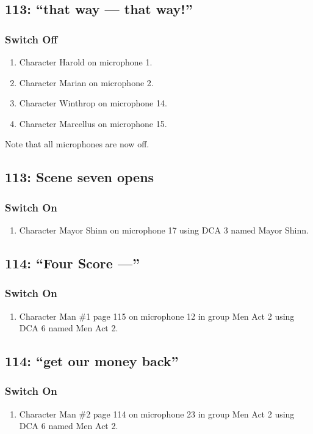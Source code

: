 \subsection* {113: ``that way --- that way!''}
\subsubsection* {Switch Off}
\begin{enumerate}
\item Character Harold on microphone 1.
\item Character Marian on microphone 2.
\item Character Winthrop on microphone 14.
\item Character Marcellus on microphone 15.
\end{enumerate}
Note that all microphones are now off.
\subsection* {113: Scene seven opens}
\subsubsection* {Switch On}
\begin{enumerate}
\item Character Mayor Shinn on microphone 17 using DCA 3 named Mayor Shinn.
\end{enumerate}
\subsection* {114: ``Four Score ---''}
\subsubsection* {Switch On}
\begin{enumerate}
\item Character Man \#1 page 115 on microphone 12 in group Men Act 2 using DCA 6 named Men Act 2.
\end{enumerate}
\subsection* {114: ``get our money back''}
\subsubsection* {Switch On}
\begin{enumerate}
\item Character Man \#2 page 114 on microphone 23 in group Men Act 2 using DCA 6 named Men Act 2.
\end{enumerate}
